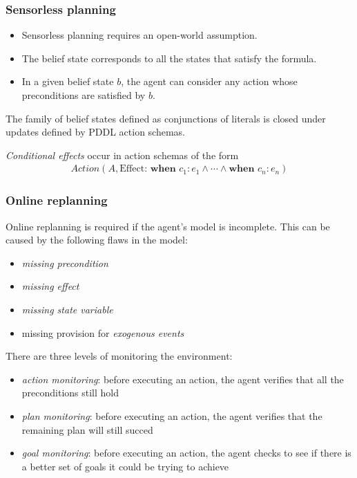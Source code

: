\documentclass{article}
\begin{document}
\subsubsection{Sensorless planning}

\begin{itemize}
    \item Sensorless planning requires an open-world assumption.
    \item The belief state corresponds to all the states that satisfy the formula.
    \item In a given belief state $b$, the agent can consider any action whose preconditions are satisfied by $b$.
\end{itemize}

\begin{theorem}
    The family of belief states defined as conjunctions of literals is closed under updates defined by PDDL
    action schemas.
\end{theorem}

\begin{definition}
    \emph{Conditional effects} occur in action schemas of the form
    \begin{align*}
        Action(A,
              \text{Effect:}\textbf{ when }c_1: e_1 \wedge \cdots \wedge \textbf{when }c_n: e_n)
    \end{align*}
\end{definition}

\subsubsection{Online replanning}

\begin{definition}
    Online replanning is required if the agent's model is incomplete.
    This can be caused by the following flaws in the model:
    \begin{itemize}
        \item \emph{missing precondition}
        \item \emph{missing effect}
        \item \emph{missing state variable}
        \item missing provision for \emph{exogenous events}
    \end{itemize}
\end{definition}

\begin{definition}
    There are three levels of monitoring the environment:
    \begin{itemize}
        \item \emph{action monitoring}: before executing an action, the agent verifies that
        all the preconditions still hold
        \item \emph{plan monitoring}: before executing an action, the agent verifies that the
        remaining plan will still succed
        \item \emph{goal monitoring}: before executing an action, the agent checks to see
        if there is a better set of goals it could be trying to achieve
    \end{itemize}
\end{definition}
\end{document}
